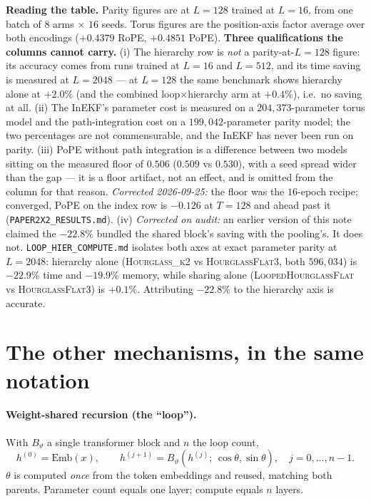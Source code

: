 \documentclass[11pt]{article}
\begin{document}
\noindent \textbf{Reading the table.} Parity figures are at $L=128$ trained at
$L=16$, from one batch of $8$ arms $\times$ $16$ seeds. Torus figures are the
position-axis factor average over both encodings ($+0.4379$ RoPE, $+0.4851$ PoPE).
\textbf{Three qualifications the columns cannot carry.}
(i) The hierarchy row is \emph{not} a parity-at-$L=128$ figure: its accuracy comes
from runs trained at $L=16$ and $L=512$, and its time saving is measured at
$L=2048$ --- at $L=128$ the same benchmark shows hierarchy alone at $+2.0\%$ (and the combined loop$\times$hierarchy arm at $+0.4\%$), i.e.\ no saving at all.
(ii) The InEKF's parameter cost is measured on a $204{,}373$-parameter torus model
and the path-integration cost on a $199{,}042$-parameter parity model; the two
percentages are not commensurable, and the InEKF has never been run on parity.
(iii) PoPE without path integration is a difference between two models sitting on
the measured floor of $0.506$ ($0.509$ vs $0.530$), with a seed spread wider than
the gap --- it is a floor artifact, not an effect, and is omitted from the column
for that reason. \emph{Corrected 2026-09-25:} the floor was the $16$-epoch recipe;
converged, PoPE on the index row is $-0.126$ at $T=128$ and ahead past it
(\texttt{PAPER2X2\_RESULTS.md}).
(iv) \emph{Corrected on audit:} an earlier version of this note claimed the
$-22.8\%$ bundled the shared block's saving with the pooling's. It does not.
\texttt{LOOP\_HIER\_COMPUTE.md} isolates both axes at exact parameter parity at
$L{=}2048$: hierarchy alone (\textsc{Hourglass\_k2} vs \textsc{HourglassFlat3},
both $596{,}034$) is $-22.9\%$ time and $-19.9\%$ memory, while sharing alone
(\textsc{LoopedHourglassFlat} vs \textsc{HourglassFlat3}) is $+0.1\%$.
Attributing $-22.8\%$ to the hierarchy axis is accurate.



\appendix

\section{The other mechanisms, in the same notation}
\label{app:other}

\paragraph{Weight-shared recursion (the ``loop'').}
With $B_\vartheta$ a single transformer block and $n$ the loop count,
\begin{equation}
  h^{(0)} = \text{Emb}(x), \qquad
  h^{(j+1)} = B_\vartheta\!\left(h^{(j)};\,\cos\theta,\sin\theta\right),\quad j=0,\dots,n-1 .
\end{equation}
$\theta$ is computed \emph{once} from the token embeddings and reused, matching
both parents. Parameter count equals one layer; compute equals $n$ layers.
\end{document}
